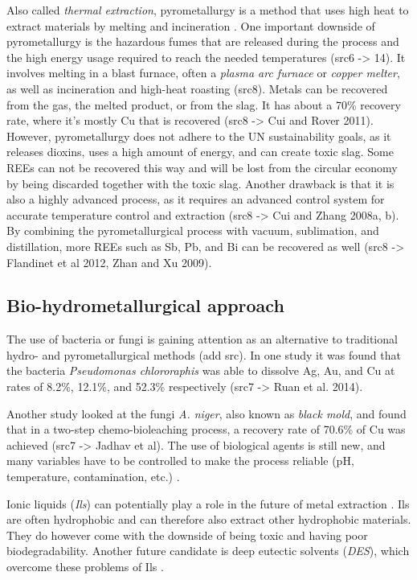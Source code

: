 Also called \textit{thermal extraction}, pyrometallurgy is a method that uses high heat to extract materials by melting and incineration \cite{javed2024}. One important downside of pyrometallurgy is the hazardous fumes that are released during the process and the high energy usage required to reach the needed temperatures (src6 -> 14). It involves melting in a blast furnace, often a \textit{plasma arc furnace} or \textit{copper melter}, as well as incineration and high-heat roasting (src8). Metals can be recovered from the gas, the melted product, or from the slag. It has about a 70\% recovery rate, where it's mostly Cu that is recovered (src8 -> Cui and Rover 2011). However, pyrometallurgy does not adhere to the UN sustainability goals, as it releases dioxins, uses a high amount of energy, and can create toxic slag. Some REEs can not be recovered this way and will be lost from the circular economy by being discarded together with the toxic slag. Another drawback is that it is also a highly advanced process, as it requires an advanced control system for accurate temperature control and extraction (src8 -> Cui and Zhang 2008a, b). By combining the pyrometallurgical process with vacuum, sublimation, and distillation, more REEs such as Sb, Pb, and Bi can be recovered as well (src8 -> Flandinet et al 2012, Zhan and Xu 2009).

\subsection{Bio-hydrometallurgical approach}

The use of bacteria or fungi is gaining attention as an alternative to traditional hydro- and pyrometallurgical methods (add src). In one study it was found that the bacteria \textit{Pseudomonas chlororaphis} was able to dissolve Ag, Au, and Cu at rates of 8.2\%, 12.1\%, and 52.3\% respectively (src7 -> Ruan et al. 2014). 

Another study looked at the fungi \textit{A. niger}, also known as \textit{black mold}, and found that in a two-step chemo-bioleaching process, a recovery rate of 70.6\% of Cu was achieved (src7 -> Jadhav et al). The use of biological agents is still new, and many variables have to be controlled to make the process reliable (pH, temperature, contamination, etc.) \cite{javed2024}. 

Ionic liquids (\textit{Ils}) can potentially play a role in the future of metal extraction \cite{javed2024}. Ils are often hydrophobic and can therefore also extract other hydrophobic materials. They do however come with the downside of being toxic and having poor biodegradability. Another future candidate is deep eutectic solvents (\textit{DES}), which overcome these problems of Ils \cite{javed2024}. 


